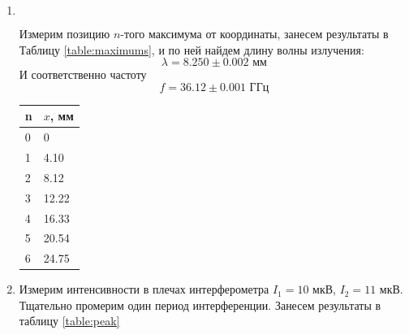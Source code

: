 \documentclass[a4paper, 12pt]{article}
\begin{document}
    \begin{enumerate}
        \item $$\:$$
        \begin{minipage}{0.5\textwidth}
            Измерим позицию $n$-того максимума от координаты, занесем результаты в Таблицу \ref{table:maximums}, и по ней найдем длину волны излучения:
            $$\lambda = 8.250 \pm 0.002 \text{ мм}$$
            И соответственно частоту
            $$f = 36.12 \pm 0.001 \text{ ГГц}$$
        \end{minipage}
        \begin{minipage}{0.5\textwidth}
        \begin{center}
            \begin{tabular}{|l|l|}
            \hline
            n & $x$, мм \\ \hline
            0 & 0       \\ \hline
            1 & 4.10    \\ \hline
            2 & 8.12    \\ \hline
            3 & 12.22   \\ \hline
            4 & 16.33   \\ \hline
            5 & 20.54   \\ \hline
            6 & 24.75   \\ \hline
            \end{tabular}
            \label{table:maximums}
        \end{center}
        \end{minipage}
        
    \item Измерим интенсивности в плечах интерферометра $I_1 = 10$ мкВ, $I_2 = 11$ мкВ. Тщательно промерим один период интерференции. Занесем результаты в таблицу \ref{table:peak} 
    

\end{enumerate}
\end{document}
